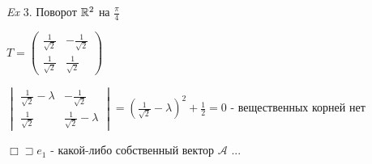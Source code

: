 \documentclass[12pt]{article}
\begin{document}
    \vspace{3mm}
\textit{Ex} 3. Поворот $\mathbb{R}^2$ на $\displaystyle \frac{\pi}{4}$

    $\displaystyle T = \begin{pmatrix}\frac{1}{\sqrt{2}} & -\frac{1}{\sqrt{2}} \\ \frac{1}{\sqrt{2}} & \frac{1}{\sqrt{2}}\end{pmatrix}$

    $\displaystyle \begin{vmatrix}\frac{1}{\sqrt{2}} - \lambda & -\frac{1}{\sqrt{2}} \\ \frac{1}{\sqrt{2}} & \frac{1}{\sqrt{2}} - \lambda\end{vmatrix} =
    \left(\frac{1}{\sqrt{2}} - \lambda\right)^2 + \frac{1}{2} = 0$ - вещественных корней нет

    $\Box \sqsupset e_1$ - какой-либо собственный вектор $\mathcal{A}$ ...
\end{document}
